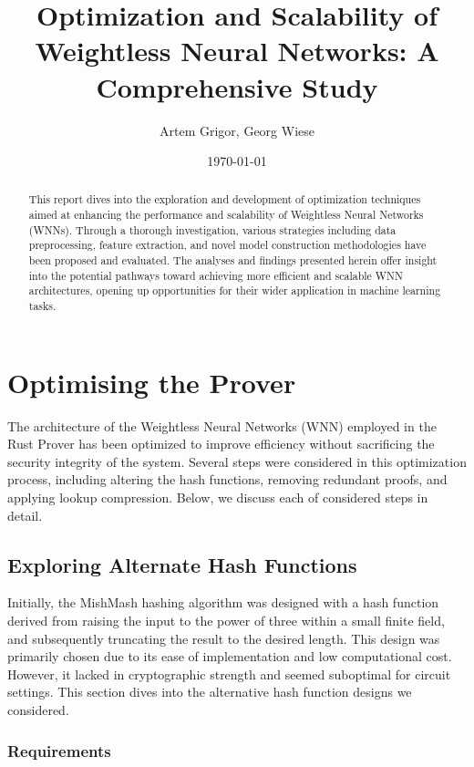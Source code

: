 \documentclass{article}[12pt]
\title{Optimization and Scalability of Weightless Neural Networks: A Comprehensive Study}
\author{Artem Grigor, Georg Wiese}
\date{\today}
\begin{document}
\maketitle

\begin{abstract}
This report dives into the exploration and development of optimization techniques aimed at enhancing the performance and scalability of Weightless Neural Networks (WNNs).
Through a thorough investigation, various strategies including data preprocessing, feature extraction, and novel model construction methodologies have been proposed and evaluated.
The analyses and findings presented herein offer insight into the potential pathways toward achieving more efficient and scalable WNN architectures, opening up opportunities for their wider application in machine learning tasks.
\end{abstract}

\newpage
\tableofcontents
\newpage


\newpage
\section{Optimising the Prover}\label{sec:optimising-architecture}

The architecture of the Weightless Neural Networks (WNN) employed in the Rust Prover has been optimized to improve efficiency without sacrificing the security integrity of the system.
Several steps were considered in this optimization process, including altering the hash functions, removing redundant proofs, and applying lookup compression.
Below, we discuss each of considered steps in detail.

\subsection{Exploring Alternate Hash Functions}\label{subsec:exploring-alternate-hash-functions}

Initially, the MishMash hashing algorithm was designed with a hash function derived from raising the input to the power of three within a small finite field, and subsequently truncating the result to the desired length.
This design was primarily chosen due to its ease of implementation and low computational cost.
However, it lacked in cryptographic strength and seemed suboptimal for circuit settings.
This section dives into the alternative hash function designs we considered.


\subsubsection{Requirements}\label{subsubsec:requirements}
\end{document}
